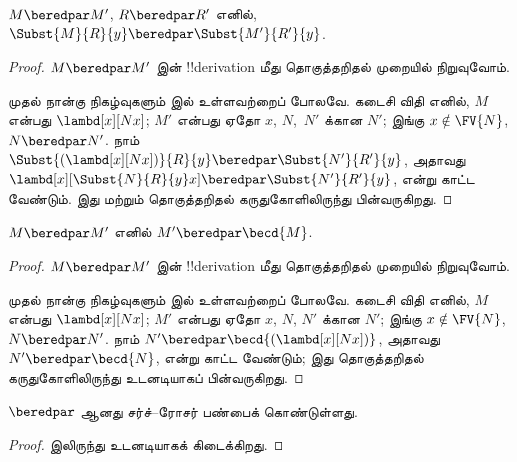 \documentclass[../../../include/open-logic-section]{subfiles}
\begin{document}
\begin{lem}
  $M \beredpar M'$, $R \beredpar R'$ எனில், $\Subst{M}{R}{y}
  \beredpar \Subst{M'}{R'}{y}$.
\end{lem}

\begin{proof}
  $M \beredpar M'$ இன் !!{derivation} மீது தொகுத்தறிதல் முறையில் நிறுவுவோம்.

  முதல் நான்கு நிகழ்வுகளும்  இல் உள்ளவற்றைப் போலவே.
  கடைசி விதி  எனில், $M$ என்பது
  $\lambd[x][Nx]$; $M'$ என்பது ஏதோ $x$, $N$,~$N'$ க்கான $N'$; இங்கு
  $x \notin \FV{N}$, $N \beredpar N'$. நாம்
  $\Subst{(\lambd[x][Nx])}{R}{y} \beredpar \Subst{N'}{R'}{y}$,
  அதாவது $\lambd[x][\Subst{N}{R}{y} x] \beredpar
  \Subst{N'}{R'}{y}$, என்று காட்ட வேண்டும். இது
   மற்றும் தொகுத்தறிதல்
  கருதுகோளிலிருந்து பின்வருகிறது.
\end{proof}

\begin{lem}
  $M \beredpar M'$ எனில் $M' \beredpar \becd{M}$.
\end{lem}

\begin{proof}
  $M \beredpar M'$ இன் !!{derivation} மீது தொகுத்தறிதல் முறையில் நிறுவுவோம்.

  முதல் நான்கு நிகழ்வுகளும்  இல் உள்ளவற்றைப் போலவே.
  கடைசி விதி  எனில், $M$ என்பது
  $\lambd[x][Nx]$; $M'$ என்பது ஏதோ $x$, $N$, $N'$ க்கான $N'$; இங்கு
  $x \notin \FV{N}$, $N \beredpar N'$. நாம் $N' \beredpar
  \becd{(\lambd[x][Nx])}$, அதாவது $N' \beredpar \becd{N}$, என்று காட்ட
  வேண்டும்; இது தொகுத்தறிதல் கருதுகோளிலிருந்து உடனடியாகப் பின்வருகிறது.
\end{proof}

\begin{thm}
  $\beredpar$ ஆனது சர்ச்--ரோசர் பண்பைக் கொண்டுள்ளது.
\end{thm}

\begin{proof}
   இலிருந்து உடனடியாகக் கிடைக்கிறது.
\end{proof}
\end{document}
